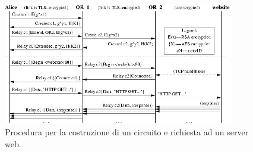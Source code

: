 \begin{figure}[!htbp]
\centering
\includegraphics[width=0.9\textwidth]{./figure//circuit-building}
\caption{Procedura per la costruzione di un circuito e richiesta ad un server web.}
\label{FIG:circbuild}
\end{figure}

\newpage
